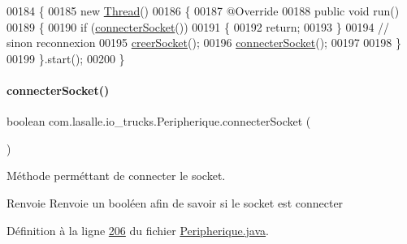 \begin{DoxyCode}
00184     \{
00185         \textcolor{keyword}{new} \hyperlink{class_thread}{Thread}()
00186         \{
00187             @Override
00188             \textcolor{keyword}{public} \textcolor{keywordtype}{void} run()
00189             \{
00190                 \textcolor{keywordflow}{if} (\hyperlink{classcom_1_1lasalle_1_1io__trucks_1_1_peripherique_a982a4e5a8178b4e9f56e6611fad707ad}{connecterSocket}())
00191                 \{
00192                     \textcolor{keywordflow}{return};
00193                 \}
00194                 \textcolor{comment}{// sinon reconnexion}
00195                 \hyperlink{classcom_1_1lasalle_1_1io__trucks_1_1_peripherique_a2965bd91f73bf87536e1c743ddc2b76a}{creerSocket}();
00196                 \hyperlink{classcom_1_1lasalle_1_1io__trucks_1_1_peripherique_a982a4e5a8178b4e9f56e6611fad707ad}{connecterSocket}();
00197 
00198             \}
00199         \}.start();
00200     \}
\end{DoxyCode}
\mbox{\label{classcom_1_1lasalle_1_1io__trucks_1_1_peripherique_a982a4e5a8178b4e9f56e6611fad707ad}} 
\paragraph{\texorpdfstring{connecter\+Socket()}{connecterSocket()}}
{\footnotesize\ttfamily boolean com.\+lasalle.\+io\+\_\+trucks.\+Peripherique.\+connecter\+Socket (\begin{DoxyParamCaption}{ }\end{DoxyParamCaption})\hspace{0.3cm}{\ttfamily [private]}}



Méthode perméttant de connecter le socket. 

\begin{DoxyReturn}{Renvoie}
Renvoie un booléen afin de savoir si le socket est connecter 
\end{DoxyReturn}


Définition à la ligne \hyperlink{_peripherique_8java_source_l00206}{206} du fichier \hyperlink{_peripherique_8java_source}{Peripherique.\+java}.



